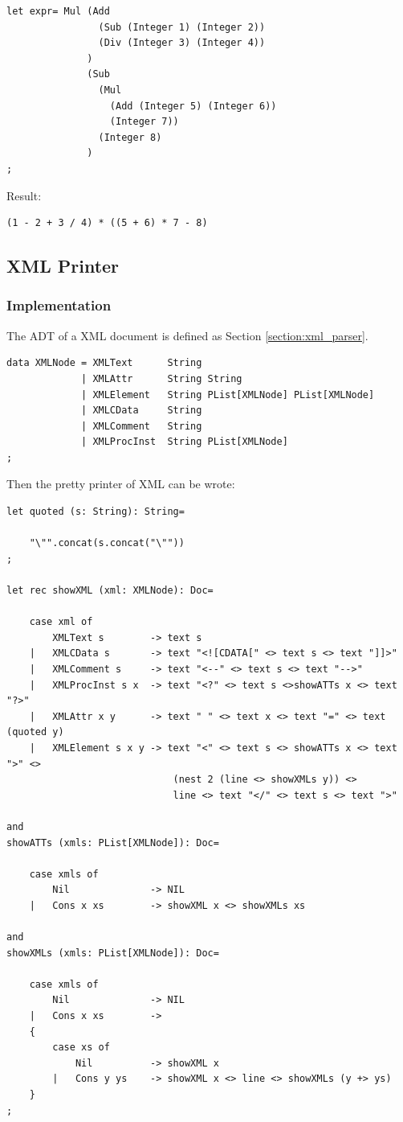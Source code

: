 \begin{lstlisting}
let expr= Mul (Add
                (Sub (Integer 1) (Integer 2))
                (Div (Integer 3) (Integer 4))
              )
              (Sub
                (Mul
                  (Add (Integer 5) (Integer 6))
                  (Integer 7))
                (Integer 8)
              )
;
\end{lstlisting}

Result:

\begin{lstlisting}
(1 - 2 + 3 / 4) * ((5 + 6) * 7 - 8)
\end{lstlisting}

\subsection{XML Printer}

\subsubsection{Implementation}
The ADT of a XML document is defined as Section \ref{section:xml_parser}.

\begin{lstlisting}
data XMLNode = XMLText      String
             | XMLAttr      String String
             | XMLElement   String PList[XMLNode] PList[XMLNode]
             | XMLCData     String
             | XMLComment   String
             | XMLProcInst  String PList[XMLNode]
;
\end{lstlisting}

Then the pretty printer of XML can be wrote:

\begin{lstlisting}
let quoted (s: String): String=

    "\"".concat(s.concat("\""))
;

let rec showXML (xml: XMLNode): Doc=

    case xml of
        XMLText s        -> text s
    |   XMLCData s       -> text "<![CDATA[" <> text s <> text "]]>"
    |   XMLComment s     -> text "<--" <> text s <> text "-->"
    |   XMLProcInst s x  -> text "<?" <> text s <>showATTs x <> text "?>"
    |   XMLAttr x y      -> text " " <> text x <> text "=" <> text (quoted y)
    |   XMLElement s x y -> text "<" <> text s <> showATTs x <> text ">" <>
                             (nest 2 (line <> showXMLs y)) <>
                             line <> text "</" <> text s <> text ">"

and
showATTs (xmls: PList[XMLNode]): Doc=

    case xmls of
        Nil              -> NIL
    |   Cons x xs        -> showXML x <> showXMLs xs

and
showXMLs (xmls: PList[XMLNode]): Doc=

    case xmls of
        Nil              -> NIL
    |   Cons x xs        ->
    {
        case xs of
            Nil          -> showXML x
        |   Cons y ys    -> showXML x <> line <> showXMLs (y +> ys)
    }
;
\end{lstlisting}

